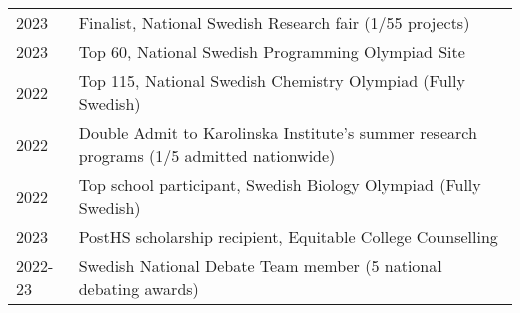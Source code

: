 
\begin{longtable}[l]{@{}p{} p{}}

    2023 & Finalist, National Swedish Research fair (1/55 projects) \\

    2023 & Top 60, National Swedish Programming Olympiad Site \\

    2022 & Top 115, National Swedish Chemistry Olympiad (Fully Swedish)\\

    2022 & Double Admit to Karolinska Institute's summer research programs (1/5 admitted nationwide)\\

    2022 & Top school participant, Swedish Biology Olympiad (Fully Swedish)\\

    2023 & PostHS scholarship recipient, Equitable College Counselling\\
   
    2022-23 & Swedish National Debate Team member (5 national debating awards)\\
   
\end{longtable}

